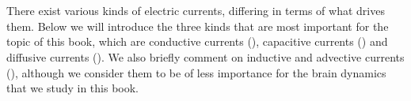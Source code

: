 \section{}
\label{sec:Basics:Current} 

There exist various kinds of electric currents, differing in terms of what drives them. Below we will introduce the three kinds that are most important for the topic of this book, which are conductive currents (),  capacitive currents () and diffusive currents (). We also briefly comment on inductive and advective currents (), although we consider them to be of less importance for the brain dynamics that we study in this book. 


